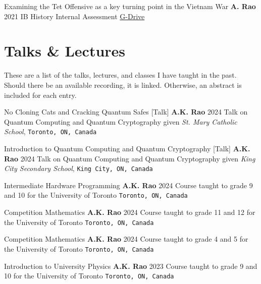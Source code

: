 \documentclass[%
               doublesided,
               paper=a4,
               fontsize=10pt
              ]{resumestyle}
\begin{document}
\publication
	{Examining the Tet Offensive as a key turning point in the Vietnam War} %
	{\textbf{A. Rao}} %
	{2021} %
	{IB History Internal Assessment} %
	{\href{https://drive.google.com/file/d/1Mtx6K0ZTZZCAHK1M3TqQMNVC3CZW2h7z/view?usp=sharing}{G-Drive}} %

\section{Talks \& Lectures}
\pubforcefullwidth

These are a list of the talks, lectures, and classes I have taught in the past. Should there be an available recording, it is linked. Otherwise, an abstract is included for each entry.
\bigskip

\publication 
    {No Cloning Cats and Cracking Quantum Safes [Talk]}
    {\textbf{A.K. Rao}}
    {2024}
    {Talk on Quantum Computing and Quantum Cryptography given \textit{St. Mary Catholic School}, \texttt{Toronto, ON, Canada}}
    
\publication 
    {Introduction to Quantum Computing and Quantum Cryptography [Talk]}
    {\textbf{A.K. Rao}}
    {2024}
    {Talk on Quantum Computing and Quantum Cryptography given \textit{King City Secondary School}, \texttt{King City, ON, Canada}}

\publication 
    {Intermediate Hardware Programming}
    {\textbf{A.K. Rao}}
    {2024}
    {Course taught to grade 9 and 10 for the University of Toronto \texttt{Toronto, ON, Canada}}

\publication 
    {Competition Mathematics}
    {\textbf{A.K. Rao}}
    {2024}
    {Course taught to grade 11 and 12 for the University of Toronto \texttt{Toronto, ON, Canada}}
    
\publication 
    {Competition Mathematics}
    {\textbf{A.K. Rao}}
    {2024}
    {Course taught to grade 4 and 5 for the University of Toronto \texttt{Toronto, ON, Canada}}

\publication 
    {Introduction to University Physics}
    {\textbf{A.K. Rao}}
    {2023}
    {Course taught to grade 9 and 10 for the University of Toronto \texttt{Toronto, ON, Canada}}
    

\end{document}
